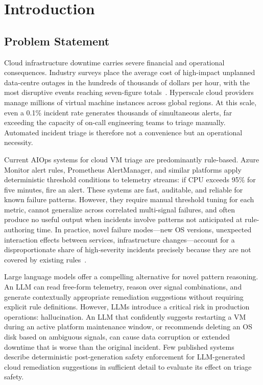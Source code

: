 \documentclass[a4paper,10pt,journal,compsoc]{IEEEtran}
\begin{document}
\section{Introduction}

\subsection{Problem Statement}

Cloud infrastructure downtime carries severe financial and operational
consequences. Industry surveys place the average cost of high-impact
unplanned data-centre outages in the hundreds of thousands of dollars
per hour, with the most disruptive events reaching seven-figure
totals~\cite{uptime2023outage}. Hyperscale
cloud providers manage millions of virtual machine instances across
global regions. At this scale, even a 0.1\% incident rate generates
thousands of simultaneous alerts, far exceeding the capacity of on-call
engineering teams to triage manually. Automated incident triage is
therefore not a convenience but an operational necessity.

Current AIOps systems for cloud VM triage are predominantly rule-based.
Azure Monitor alert rules, Prometheus AlertManager, and similar
platforms apply deterministic threshold conditions to telemetry
streams: if CPU exceeds 95\% for five minutes, fire an alert. These
systems are fast, auditable, and reliable for known failure patterns.
However, they require manual threshold tuning for each metric, cannot
generalize across correlated multi-signal failures, and often produce
no useful output when incidents involve patterns not anticipated at
rule-authoring time.
In practice, novel failure modes---new OS versions, unexpected
interaction effects between services, infrastructure changes---account
for a disproportionate share of high-severity incidents precisely
because they are not covered by existing rules~\cite{chen2024rcacopilot}.

Large language models offer a compelling alternative for novel pattern
reasoning. An LLM can read free-form telemetry, reason over signal
combinations, and generate contextually appropriate remediation
suggestions without requiring explicit rule definitions. However, LLMs
introduce a critical risk in production operations: hallucination. An
LLM that confidently suggests restarting a VM during an active platform
maintenance window, or recommends deleting an OS disk based on
ambiguous signals, can cause data corruption or extended downtime that
is worse than the original incident. Few published systems describe
deterministic post-generation safety enforcement for LLM-generated
cloud remediation suggestions in sufficient detail to evaluate its
effect on triage safety.
\end{document}
